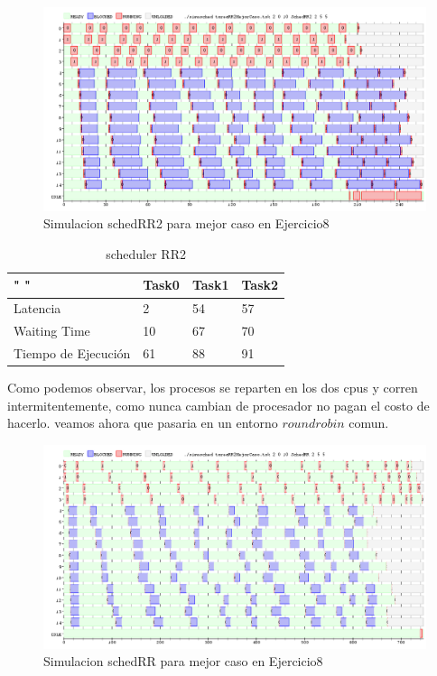 \documentclass[11pt]{article}
\begin{document}

  \begin{figure}[H]
    \includegraphics[scale=0.5]{Ej8MejorCasoRR2}
    \caption{Simulacion schedRR2 para mejor caso en Ejercicio8}
  \end{figure}

  \begin{table}[htb]
  \centering
  \begin{tabular}{| l | l | l | l |}
  \hline
  " " & Task0 & Task1 & Task2 \\
  \hline \hline
  Latencia & 2 & 54 & 57 \\ \hline
  Waiting Time & 10 & 67 & 70 \\ \hline
  Tiempo de Ejecución & 61 & 88 & 91 \\ \hline
  \end{tabular}
  \caption{scheduler RR2}
  \end{table}

Como podemos observar, los procesos se reparten en los dos cpus y corren intermitentemente, como nunca cambian de procesador no pagan el costo de hacerlo. veamos ahora que pasaria en un entorno $round robin$ comun.

  \begin{figure}[H]
    \includegraphics[scale=0.5]{Ej8MejorCasoRR}
    \caption{Simulacion schedRR para mejor caso en Ejercicio8}
  \end{figure}
\end{document}
